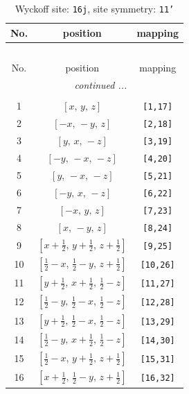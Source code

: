 \documentclass[fleqn,8pt]{jsarticle}
\begin{document}
\begin{longtable}{ccc}
\caption{Wyckoff site: {\tt 16j}, site symmetry: {\tt 11'}}
 \\
 \hline \hline
No. & position & mapping \\ \hline \endfirsthead

\multicolumn{2}{l}{\tablename\ \thetable{}} \\
 \hline \hline
No. & position & mapping \\ \hline \endhead

 \hline \hline
\multicolumn{2}{r}{\footnotesize\it continued ...} \\ \endfoot

 \hline \hline
\multicolumn{2}{r}{} \\ \endlastfoot

1 & $\left[ x,\, y,\, z \right]$ & {\tt [1,17]} \\ \hline
2 & $\left[ - x,\, - y,\, z \right]$ & {\tt [2,18]} \\ \hline
3 & $\left[ y,\, x,\, - z \right]$ & {\tt [3,19]} \\ \hline
4 & $\left[ - y,\, - x,\, - z \right]$ & {\tt [4,20]} \\ \hline
5 & $\left[ y,\, - x,\, - z \right]$ & {\tt [5,21]} \\ \hline
6 & $\left[ - y,\, x,\, - z \right]$ & {\tt [6,22]} \\ \hline
7 & $\left[ - x,\, y,\, z \right]$ & {\tt [7,23]} \\ \hline
8 & $\left[ x,\, - y,\, z \right]$ & {\tt [8,24]} \\ \hline
9 & $\left[ x + \frac{1}{2},\, y + \frac{1}{2},\, z + \frac{1}{2} \right]$ & {\tt [9,25]} \\ \hline
10 & $\left[ \frac{1}{2} - x,\, \frac{1}{2} - y,\, z + \frac{1}{2} \right]$ & {\tt [10,26]} \\ \hline
11 & $\left[ y + \frac{1}{2},\, x + \frac{1}{2},\, \frac{1}{2} - z \right]$ & {\tt [11,27]} \\ \hline
12 & $\left[ \frac{1}{2} - y,\, \frac{1}{2} - x,\, \frac{1}{2} - z \right]$ & {\tt [12,28]} \\ \hline
13 & $\left[ y + \frac{1}{2},\, \frac{1}{2} - x,\, \frac{1}{2} - z \right]$ & {\tt [13,29]} \\ \hline
14 & $\left[ \frac{1}{2} - y,\, x + \frac{1}{2},\, \frac{1}{2} - z \right]$ & {\tt [14,30]} \\ \hline
15 & $\left[ \frac{1}{2} - x,\, y + \frac{1}{2},\, z + \frac{1}{2} \right]$ & {\tt [15,31]} \\ \hline
16 & $\left[ x + \frac{1}{2},\, \frac{1}{2} - y,\, z + \frac{1}{2} \right]$ & {\tt [16,32]} \\
\end{longtable}
\end{document}
